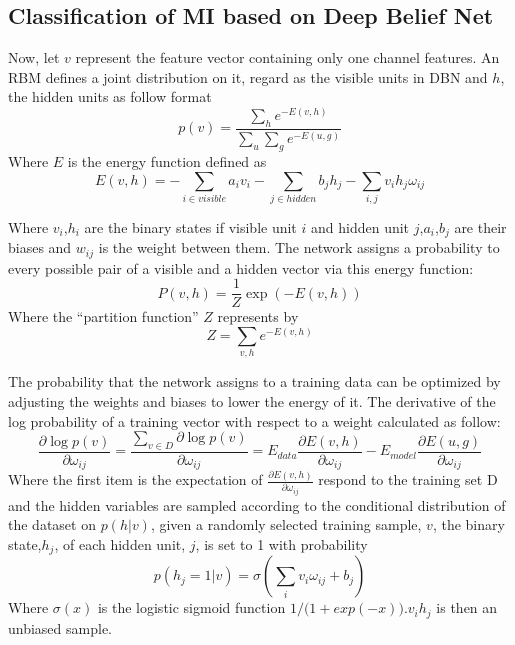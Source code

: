 \documentclass{llncs}
\begin{document}
\subsection{Classification of MI based on Deep Belief Net}
Now, let $v$ represent the feature vector containing only one channel features. An RBM defines a joint distribution on it, regard as the visible units in DBN and $h$, the hidden units as follow format\cite{13}
\begin{equation}
 p(v)=\frac{\sum_he^{-E(v,h)}}{\sum_u\sum_ge^{-E(u,g)}}
\end{equation}
Where $E$ is the energy function defined as
\begin{equation}
  E(v,h)=-\sum_{i \in visible}a_iv_i-
  \sum_{j \in hidden}b_jh_j-\sum_{i,j}v_ih_j\omega_{ij}
\end{equation}


Where $v_i$,$h_i$ are the binary states if visible unit $i$ and hidden unit $j$,$a_i$,$b_j$ are their biases and $w_{ij}$ is the weight between them. The network assigns a probability to every possible pair of a visible and a hidden vector via this energy function:
\begin{equation}
  P(v,h)=\frac{1}{Z}\exp(-E(v,h))
\end{equation}
Where the “partition function” $Z$ represents by
\begin{equation}
 Z=\sum_{v,h}e^{-E(v,h)}
\end{equation}


The probability that the network assigns to a training data can be optimized by adjusting the
weights and biases to lower the energy of it. The derivative of the log probability of a training vector with respect to a weight calculated as follow:
\begin{equation}
\frac{\partial \log p(v)}{\partial \omega_{ij}}
=\frac{\sum_{v \in D}\partial \log p(v)}{\partial \omega_{ij}}
=E_{data}\frac{\partial E(v,h)}{\partial \omega_{ij}}-
E_{model}\frac{\partial E(u,g)}{\partial \omega_{ij}}
\end{equation}
Where the first item is the expectation of $\frac{\partial E(v,h)}{\partial \omega_{ij}}$ respond to the training set D and the hidden variables are sampled according to the conditional distribution of the dataset on $p(h|v)$, given a randomly selected training sample, $v$, the binary state,$h_j$, of each hidden unit, $j$, is set to 1 with probability
\begin{equation}
 p(h_j=1|v)=\sigma(\sum_{i}v_i\omega_{ij}+b_j)
\end{equation}
Where $\sigma(x)$ is the logistic sigmoid function ${1}/{(1+exp{(-x))}}$.$v_ih_j$ is then an unbiased sample.
\end{document}
